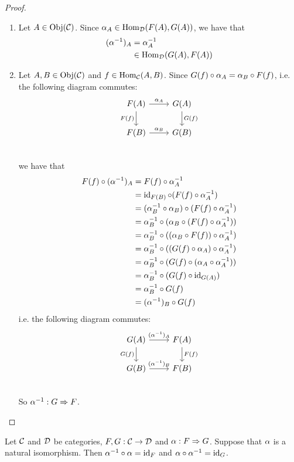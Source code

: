 \documentclass{book}
\begin{document}
	\begin{proof}\
		\begin{enumerate}
			\item Let $A \in \operatorname{Obj}(\mathcal{C})$. Since $\alpha_A \in \operatorname{Hom}_{\mathcal{D}}(F(A), G(A))$, we have that 
			\begin{align*}
				(\alpha^{-1})_A
				& = \alpha_A^{-1} \\
				& \in \operatorname{Hom}_{\mathcal{D}}(G(A), F(A))
			\end{align*}
			\item Let $A, B \in \operatorname{Obj}(\mathcal{C})$ and $f \in \operatorname{Hom}_{\mathcal{C}}(A,B)$. Since $G(f) \circ \alpha_A = \alpha_B \circ F(f)$, i.e. the following diagram commutes:
			\[ 
			\begin{tikzcd}
				F(A)  \arrow[r, "\al_A"]  \arrow[d, "F(f)"']  & G(A)   \arrow[d, "G(f)"]\\
				F(B) \arrow[r, "\al_B"] &  G(B) \\
			\end{tikzcd}
			\]
			we have that 
			\begin{align*}
				F(f) \circ (\alpha^{-1})_A 
				& = F(f) \circ \alpha_A^{-1} \\
				& = \operatorname{id}_{F(B)} \circ (F(f) \circ \alpha_A^{-1}) \\
				& = (\alpha_B^{-1} \circ \alpha_B) \circ (F(f) \circ \alpha_A^{-1}) \\
				& = \alpha_B^{-1} \circ (\alpha_B \circ (F(f) \circ \alpha_A^{-1})) \\
				& = \alpha_B^{-1} \circ ((\alpha_B \circ F(f)) \circ \alpha_A^{-1}) \\
				& = \alpha_B^{-1} \circ ((G(f) \circ \alpha_A) \circ \alpha_A^{-1}) \\
				& = \alpha_B^{-1} \circ (G(f) \circ (\alpha_A \circ \alpha_A^{-1})) \\
				& = \alpha_B^{-1} \circ (G(f) \circ \operatorname{id}_{G(A)}) \\
				& = \alpha_B^{-1} \circ G(f) \\
				& = (\alpha^{-1})_B \circ G(f) 
			\end{align*}
			i.e. the following diagram commutes:
			\[ 
			\begin{tikzcd}
				G(A)  \arrow[r, "(\al^{-1})_A"]  \arrow[d, "G(f)"']  & F(A)   \arrow[d, "F(f)"]\\
				G(B) \arrow[r, "(\al^{-1})_B"] &  F(B) \\
			\end{tikzcd}
			\]
			So $\alpha^{-1}: G \Rightarrow F$.
		\end{enumerate}
	\end{proof}

	\begin{ex} 
		Let $\mathcal{C}$ and $\mathcal{D}$ be categories, $F,G: \mathcal{C} \rightarrow \mathcal{D}$ and $\alpha : F \Rightarrow G$. Suppose that $\alpha$ is a natural isomorphism. Then $\alpha^{-1} \circ \alpha = \operatorname{id}_{F}$ and $\alpha \circ \alpha^{-1} = \operatorname{id}_G$.
	\end{ex}
	
\end{document}
